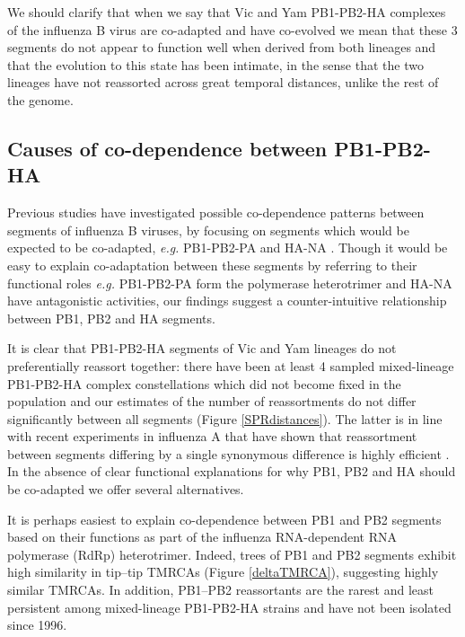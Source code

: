 \documentclass[11pt,oneside,letterpaper]{article}
\begin{document}
We should clarify that when we say that Vic and Yam PB1-PB2-HA complexes of the influenza B virus are co-adapted and have co-evolved we mean that these 3 segments do not appear to function well when derived from both lineages and that the evolution to this state has been intimate, in the sense that the two lineages have not reassorted across great temporal distances, unlike the rest of the genome.


\subsection*{Causes of co-dependence between PB1-PB2-HA}
Previous studies have investigated possible co-dependence patterns between segments of influenza B viruses, by focusing on segments which would be expected to be co-adapted, \textit{e.g.} PB1-PB2-PA and HA-NA \cite{mccullers2004}.
Though it would be easy to explain co-adaptation between these segments by referring to their functional roles \textit{e.g.} PB1-PB2-PA form the polymerase heterotrimer and HA-NA have antagonistic activities, our findings suggest a counter-intuitive relationship between PB1, PB2 and HA segments.

It is clear that PB1-PB2-HA segments of Vic and Yam lineages do not preferentially reassort together: there have been at least 4 sampled mixed-lineage PB1-PB2-HA complex constellations which did not become fixed in the population and our estimates of the number of reassortments do not differ significantly between all segments (Figure \ref{SPRdistances}).
The latter is in line with recent experiments in influenza A that have shown that reassortment between segments differing by a single synonymous difference is highly efficient \cite{marshall2013}.
In the absence of clear functional explanations for why PB1, PB2 and HA should be co-adapted we offer several alternatives.

It is perhaps easiest to explain co-dependence between PB1 and PB2 segments based on their functions as part of the influenza RNA-dependent RNA polymerase (RdRp) heterotrimer.
Indeed, trees of PB1 and PB2 segments exhibit high similarity in tip--tip TMRCAs (Figure \ref{deltaTMRCA}), suggesting highly similar TMRCAs.
In addition, PB1--PB2 reassortants are the rarest and least persistent among mixed-lineage PB1-PB2-HA strains and have not been isolated since 1996.
\end{document}
